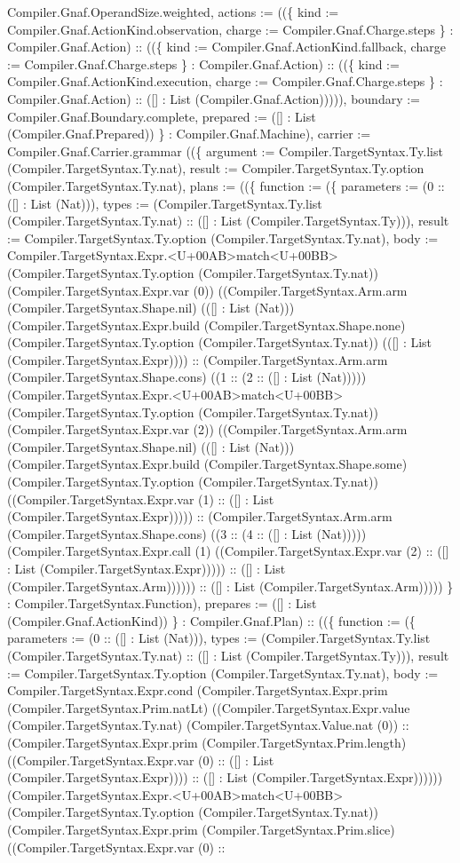 \documentclass[11pt]{article}
\begin{document}
Compiler.Gnaf.OperandSize.weighted, actions := ((\{ kind := Compiler.Gnaf.ActionKind.observation, charge := Compiler.Gnaf.Charge.steps \} : Compiler.Gnaf.Action) :: ((\{ kind := Compiler.Gnaf.ActionKind.fallback, charge := Compiler.Gnaf.Charge.steps \} : Compiler.Gnaf.Action) :: ((\{ kind := Compiler.Gnaf.ActionKind.execution, charge := Compiler.Gnaf.Charge.steps \} : Compiler.Gnaf.Action) :: ([] : List (Compiler.Gnaf.Action))))), boundary := Compiler.Gnaf.Boundary.complete, prepared := ([] : List (Compiler.Gnaf.Prepared)) \} : Compiler.Gnaf.Machine), carrier := Compiler.Gnaf.Carrier.grammar ((\{ argument := Compiler.TargetSyntax.Ty.list (Compiler.TargetSyntax.Ty.nat), result := Compiler.TargetSyntax.Ty.option (Compiler.TargetSyntax.Ty.nat), plans := ((\{ function := (\{ parameters := (0 :: ([] : List (Nat))), types := (Compiler.TargetSyntax.Ty.list (Compiler.TargetSyntax.Ty.nat) :: ([] : List (Compiler.TargetSyntax.Ty))), result := Compiler.TargetSyntax.Ty.option (Compiler.TargetSyntax.Ty.nat), body := Compiler.TargetSyntax.Expr.<U+00AB>match<U+00BB> (Compiler.TargetSyntax.Ty.option (Compiler.TargetSyntax.Ty.nat)) (Compiler.TargetSyntax.Expr.var (0)) ((Compiler.TargetSyntax.Arm.arm (Compiler.TargetSyntax.Shape.nil) (([] : List (Nat))) (Compiler.TargetSyntax.Expr.build (Compiler.TargetSyntax.Shape.none) (Compiler.TargetSyntax.Ty.option (Compiler.TargetSyntax.Ty.nat)) (([] : List (Compiler.TargetSyntax.Expr)))) :: (Compiler.TargetSyntax.Arm.arm (Compiler.TargetSyntax.Shape.cons) ((1 :: (2 :: ([] : List (Nat))))) (Compiler.TargetSyntax.Expr.<U+00AB>match<U+00BB> (Compiler.TargetSyntax.Ty.option (Compiler.TargetSyntax.Ty.nat)) (Compiler.TargetSyntax.Expr.var (2)) ((Compiler.TargetSyntax.Arm.arm (Compiler.TargetSyntax.Shape.nil) (([] : List (Nat))) (Compiler.TargetSyntax.Expr.build (Compiler.TargetSyntax.Shape.some) (Compiler.TargetSyntax.Ty.option (Compiler.TargetSyntax.Ty.nat)) ((Compiler.TargetSyntax.Expr.var (1) :: ([] : List (Compiler.TargetSyntax.Expr))))) :: (Compiler.TargetSyntax.Arm.arm (Compiler.TargetSyntax.Shape.cons) ((3 :: (4 :: ([] : List (Nat))))) (Compiler.TargetSyntax.Expr.call (1) ((Compiler.TargetSyntax.Expr.var (2) :: ([] : List (Compiler.TargetSyntax.Expr))))) :: ([] : List (Compiler.TargetSyntax.Arm)))))) :: ([] : List (Compiler.TargetSyntax.Arm))))) \} : Compiler.TargetSyntax.Function), prepares := ([] : List (Compiler.Gnaf.ActionKind)) \} : Compiler.Gnaf.Plan) :: ((\{ function := (\{ parameters := (0 :: ([] : List (Nat))), types := (Compiler.TargetSyntax.Ty.list (Compiler.TargetSyntax.Ty.nat) :: ([] : List (Compiler.TargetSyntax.Ty))), result := Compiler.TargetSyntax.Ty.option (Compiler.TargetSyntax.Ty.nat), body := Compiler.TargetSyntax.Expr.cond (Compiler.TargetSyntax.Expr.prim (Compiler.TargetSyntax.Prim.natLt) ((Compiler.TargetSyntax.Expr.value (Compiler.TargetSyntax.Ty.nat) (Compiler.TargetSyntax.Value.nat (0)) :: (Compiler.TargetSyntax.Expr.prim (Compiler.TargetSyntax.Prim.length) ((Compiler.TargetSyntax.Expr.var (0) :: ([] : List (Compiler.TargetSyntax.Expr)))) :: ([] : List (Compiler.TargetSyntax.Expr)))))) (Compiler.TargetSyntax.Expr.<U+00AB>match<U+00BB> (Compiler.TargetSyntax.Ty.option (Compiler.TargetSyntax.Ty.nat)) (Compiler.TargetSyntax.Expr.prim (Compiler.TargetSyntax.Prim.slice) ((Compiler.TargetSyntax.Expr.var (0) :: 
\end{document}

